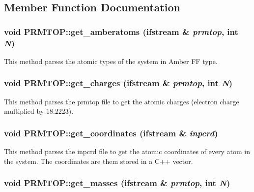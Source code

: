 \subsection{Member Function Documentation}
\hypertarget{classPRMTOP_a3e2a5ff95e8c590dff48b70bcfb4bc5c}{
\subsubsection[{get\_\-amberatoms}]{\setlength{\rightskip}{0pt plus 5cm}void PRMTOP::get\_\-amberatoms (ifstream \& {\em prmtop}, \/  int {\em N})}}
\label{classPRMTOP_a3e2a5ff95e8c590dff48b70bcfb4bc5c}
This method parses the atomic types of the system in Amber FF type. \hypertarget{classPRMTOP_a945c862c383b5983a5a6f7e12880d92d}{
\subsubsection[{get\_\-charges}]{\setlength{\rightskip}{0pt plus 5cm}void PRMTOP::get\_\-charges (ifstream \& {\em prmtop}, \/  int {\em N})}}
\label{classPRMTOP_a945c862c383b5983a5a6f7e12880d92d}
This method parses the prmtop file to get the atomic charges (electron charge multiplied by 18.2223). \hypertarget{classPRMTOP_aa0673ca09290212cddc944cd88c475c4}{
\subsubsection[{get\_\-coordinates}]{\setlength{\rightskip}{0pt plus 5cm}void PRMTOP::get\_\-coordinates (ifstream \& {\em inpcrd})}}
\label{classPRMTOP_aa0673ca09290212cddc944cd88c475c4}
This method parses the inpcrd file to get the atomic coordinates of every atom in the system. The coordinates are them stored in a C++ vector. \hypertarget{classPRMTOP_a4861564abec2a2b093edb25f5a6e1d56}{
\subsubsection[{get\_\-masses}]{\setlength{\rightskip}{0pt plus 5cm}void PRMTOP::get\_\-masses (ifstream \& {\em prmtop}, \/  int {\em N})}}
